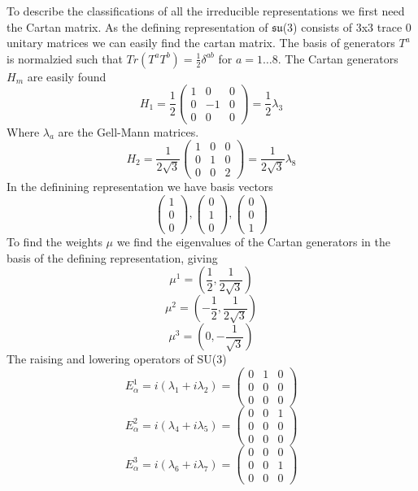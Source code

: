 \documentclass[12pt]{article}
\begin{document}
To describe the classifications of all the irreducible representations we first need the Cartan matrix. As the defining representation of $\mathfrak{su}$(3) consists of 3x3 trace 0 unitary matrices we can easily find the cartan matrix. The basis of generators $T^a$ is normalzied such that $Tr (T^a T^b) = \frac{1}{2} \delta^{ab}$ for $a = 1 \ldots 8$. The Cartan generators $H_m$ are easily found 
$$ H_1 = \frac{1}{2}\begin{pmatrix}
  1&0&0\\0&-1&0\\0&0&0
\end{pmatrix} = \frac{1}{2} \lambda_3 $$
Where $\lambda_a$ are the Gell-Mann matrices. 
$$ H_2 = \frac{1}{2 \sqrt{3}}\begin{pmatrix}
  1&0&0\\0&1&0\\0&0&2
\end{pmatrix} = \frac{1}{2 \sqrt{3}} \lambda_8 $$
In the definining representation we have basis vectors 
$$ \begin{pmatrix}
  1\\0\\0
\end{pmatrix}, \begin{pmatrix}
  0\\1\\0
\end{pmatrix}, \begin{pmatrix}
  0\\0\\1
\end{pmatrix} $$
To find the weights $\mu$ we find the eigenvalues of the Cartan generators in the basis of the defining representation, giving 
$$ \mu^1 = (\frac{1}{2}, \frac{1}{2 \sqrt{3} }) $$
$$ \mu^2 = (-\frac{1}{2}, \frac{1}{2 \sqrt{3} }) $$
$$ \mu^3 = (0, - \frac{1}{\sqrt{3} }) $$
The raising and lowering operators of SU(3) 
$$ E^1_{\alpha} = i(\lambda_1 + i \lambda_2 ) = \begin{pmatrix}
  0&1&0 \\ 0&0&0 \\ 0&0&0 
\end{pmatrix} $$
$$ E^2_{\alpha} = i(\lambda_4 + i \lambda_5 ) = \begin{pmatrix}
  0&0&1 \\ 0&0&0 \\ 0&0&0 
\end{pmatrix} $$
$$ E^3_{\alpha} = i(\lambda_6 + i \lambda_7 ) = \begin{pmatrix}
  0&0&0 \\ 0&0&1 \\ 0&0&0 
\end{pmatrix} $$
\end{document}

